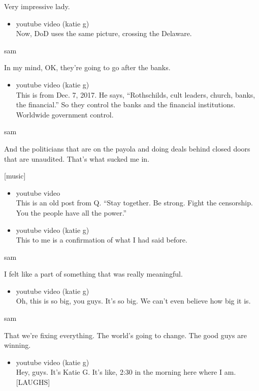Very impressive lady.

\begin{itemize}
\tightlist
\item
  youtube video (katie g)\\
  Now, DoD uses the same picture, crossing the Delaware.
\end{itemize}

sam

In my mind, OK, they're going to go after the banks.

\begin{itemize}
\tightlist
\item
  youtube video (katie g)\\
  This is from Dec. 7, 2017. He says, ``Rothschilds, cult leaders,
  church, banks, the financial.'' So they control the banks and the
  financial institutions. Worldwide government control.
\end{itemize}

sam

And the politicians that are on the payola and doing deals behind closed
doors that are unaudited. That's what sucked me in.

{[}music{]}

\begin{itemize}
\item
  youtube video\\
  This is an old post from Q. ``Stay together. Be strong. Fight the
  censorship. You the people have all the power.''
\item
  youtube video (katie g)\\
  This to me is a confirmation of what I had said before.
\end{itemize}

sam

I felt like a part of something that was really meaningful.

\begin{itemize}
\tightlist
\item
  youtube video (katie g)\\
  Oh, this is so big, you guys. It's so big. We can't even believe how
  big it is.
\end{itemize}

sam

That we're fixing everything. The world's going to change. The good guys
are winning.

\begin{itemize}
\tightlist
\item
  youtube video (katie g)\\
  Hey, guys. It's Katie G. It's like, 2:30 in the morning here where I
  am. {[}LAUGHS{]}
\end{itemize}

